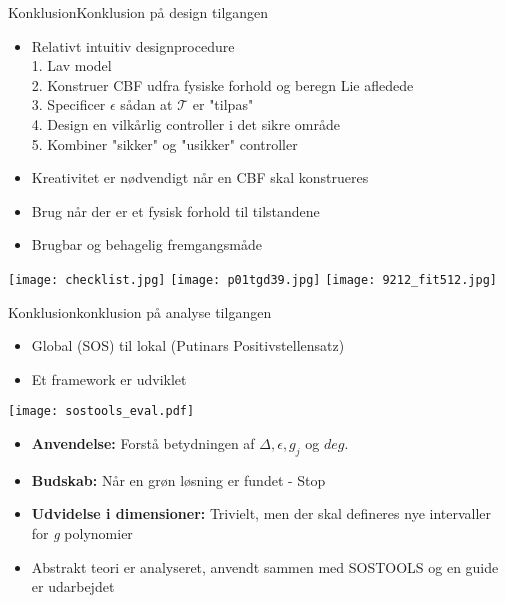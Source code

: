 \begin{frame}{Konklusion}{Konklusion på design tilgangen}
\begin{itemize}
	\item Relativt intuitiv designprocedure \\	\vspace*{0.08cm}
	\scriptsize {\color{white}{m}} 1. Lav model \\	
    \scriptsize {\color{white}{m}} 2. Konstruer CBF udfra fysiske forhold og beregn Lie afledede\\	
    \scriptsize {\color{white}{m}} 3. Specificer $\epsilon$ sådan at $\mathcal{T}$ er "tilpas" \\	
    \scriptsize {\color{white}{m}} 4. Design en vilkårlig controller i det sikre område \\ 	
    \scriptsize {\color{white}{m}} 5. Kombiner "sikker" og "usikker" controller \\
	\item \normalsize Kreativitet er nødvendigt når en CBF skal konstrueres
	\item Brug når der er et fysisk forhold til tilstandene
	\item Brugbar og behagelig fremgangsmåde
\end{itemize}
\vspace*{0.2cm}
\texttt{[image: checklist.jpg]} \hspace*{0.2cm}
\texttt{[image: p01tgd39.jpg]} \hspace*{0.2cm}
\texttt{[image: 9212\_fit512.jpg]}
\end{frame}



\begin{frame}{Konklusion}{konklusion på analyse tilgangen}
\begin{itemize}
	\item Global (SOS) til lokal (Putinars Positivstellensatz)
	\item Et framework er udviklet
\end{itemize}

\texttt{[image: sostools\_eval.pdf]}

\begin{itemize}
	\item \textbf{Anvendelse:} Forstå betydningen af $\Delta, \epsilon, g_j$ og $deg$.
	\item \textbf{Budskab:} Når en grøn løsning er fundet - Stop
	\item \textbf{Udvidelse i dimensioner:} Trivielt, men der skal defineres nye intervaller for \textit{g} polynomier 
	\item Abstrakt teori er analyseret, anvendt sammen med SOSTOOLS og en guide er udarbejdet
\end{itemize}

\end{frame}

